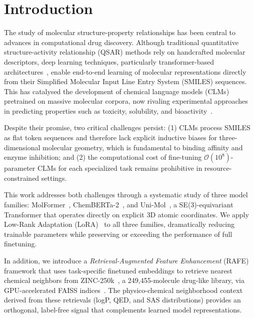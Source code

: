 \documentclass[pdflatex,sn-mathphys-num]{sn-jnl}%
\theoremstyle{thmstyleone}%
\theoremstyle{thmstyletwo}%
\theoremstyle{thmstylethree}%
\begin{document}
\section{Introduction}\label{sec1}
The study of molecular structure-property relationships has been central to advances in computational drug discovery. Although traditional quantitative structure-activity relationship (QSAR) methods rely on handcrafted molecular descriptors, deep learning techniques, particularly transformer-based architectures~\cite{vaswani2017attention}, enable end-to-end learning of molecular representations directly from their Simplified Molecular Input Line Entry System (SMILES) sequences. This has catalysed the development of chemical language models (CLMs) pretrained on massive molecular corpora, now rivaling experimental approaches in predicting properties such as toxicity, solubility, and bioactivity~\cite{ahmad2022chemberta2,huang2020deeppurpose}.

Despite their promise, two critical challenges persist: (1) CLMs process SMILES as flat token sequences and therefore lack explicit inductive biases for three-dimensional molecular geometry, which is fundamental to binding affinity and enzyme inhibition; and (2) the computational cost of fine-tuning $\mathcal{O}(10^8)$-parameter CLMs for each specialized task remains prohibitive in resource-constrained settings.

This work addresses both challenges through a systematic study of three model families: MolFormer~\cite{ross2022molformer}, ChemBERTa-2~\cite{ahmad2022chemberta2}, and Uni-Mol~\cite{zhou2023unimol}, a SE(3)-equivariant Transformer that operates directly on explicit 3D atomic coordinates. We apply Low-Rank Adaptation (LoRA)~\cite{hu2021lora} to all three families, dramatically reducing trainable parameters while preserving or exceeding the performance of full finetuning.

In addition, we introduce a \emph{Retrieval-Augmented Feature Enhancement} (RAFE) framework that uses task-specific finetuned embeddings to retrieve nearest chemical neighbors from ZINC-250k~\cite{gomez2018automatic}, a 249,455-molecule drug-like library, via GPU-accelerated FAISS indices~\cite{johnson2021faiss}. The physico-chemical neighborhood context derived from these retrievals (logP, QED, and SAS distributions) provides an orthogonal, label-free signal that complements learned model representations.
\end{document}
